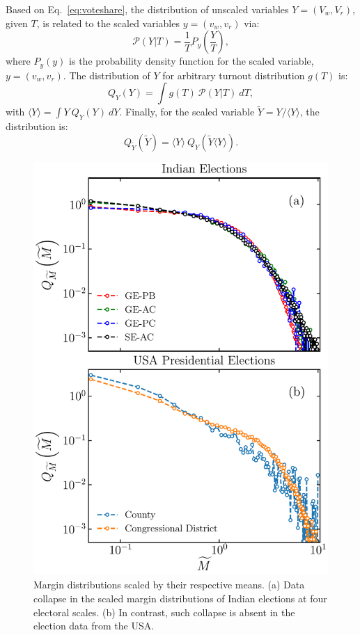 \documentclass[reprint, pre, twocolumn, aps, showpacs, superscriptaddress]{revtex4-2}
\begin{document}
Based on Eq.~\ref{eq:voteshare}, the distribution of unscaled variables $Y = (V_w, V_r)$, given $T$, is related to the scaled variables $y = (v_w, v_r)$ via:
\begin{equation}
    \mathcal{P}(Y|T) = \frac{1}{T}P_y\left(\frac{Y}{T}\right),
    \label{eq:PYT}
\end{equation}
where $P_y(y)$ is the probability density function for the scaled variable, $y = (v_w, v_r)$. The distribution of $Y$ for arbitrary turnout distribution $g(T)$ is:
\begin{equation}
    Q_Y(Y) = \int g(T)~\mathcal{P}(Y|T)~dT, 
    \label{eq:QY}
\end{equation}
with $\langle Y \rangle = \int Y ~  Q_Y(Y)~dY$.
Finally, for the scaled variable $\widetilde{Y} = Y / \langle Y \rangle$, the distribution is:
\begin{equation}
    Q_{\widetilde{Y}}(\widetilde{Y}) =  \langle Y \rangle ~ Q_Y(\widetilde{Y}  \langle Y \rangle). 
    \label{eq:QYscaled}
\end{equation}
\begin{figure}[h!]
    \centering
    \includegraphics[width=1\linewidth]{fig_3.pdf}
    \caption{Margin distributions scaled by their respective means. (a) Data collapse in the scaled margin distributions of Indian elections at four electoral scales. (b) In contrast, such collapse is absent in the election data from the USA.}
    \label{fig:3}
\end{figure}
\end{document}
